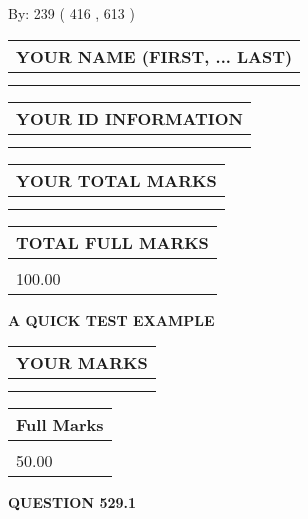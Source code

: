 \documentclass[12pt]{article}
\begin{document}
   
\hspace{1.0in} By: 
 239 ( 416 ,  613 )
   
   
   
   
\newpage 
\setcounter{page}{ 
   529001 } 
   
   
   
   
\noindent\begin{tabular}{|l|}
\hline
YOUR NAME (FIRST, ... LAST)  \\
\hline
 \\ 
 \\ 
\hline
\end{tabular}
\hspace{0.05in} \begin{tabular}{|l|}
\hline
 YOUR   ID   INFORMATION  \\
\hline
 \\ 
 \\ 
\hline
\end{tabular}
   
   
\vspace{0.2in}\noindent\begin{tabular}{|l|}
\hline
YOUR TOTAL MARKS  \\
\hline
 \\ 
 \\ 
\hline
\end{tabular}
\hspace{0.05in} \begin{tabular}{|l|}
\hline
TOTAL FULL MARKS  \\
\hline
 \\ 
100.00 \\
\hline
\end{tabular}
   
   
 \vspace{0.2in}
{\LARGE {\textbf{ A QUICK TEST EXAMPLE}}}
   
   
  
\vspace{0.2in}
  
\noindent\begin{tabular}{|l|}
\hline
 YOUR MARKS  \\
\hline
 \\ 
 \\ 
\hline
\end{tabular}
\hspace{0.05in} \begin{tabular}{|l|}
\hline
 Full Marks  \\
\hline
 \\ 
50.00 \\
\hline
\end{tabular}
{\textbf{\Large{QUESTION
529.1 
}}}
  
\end{document}
